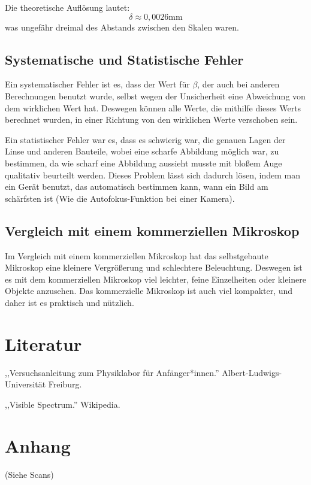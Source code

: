 \documentclass[11pt,a4paper]{article}
\begin{document}
Die theoretische Auflösung lautet:
$$\delta \approx 0,0026 \textrm{mm}$$
was ungefähr dreimal des Abstands zwischen den Skalen waren. 
\subsection{Systematische und Statistische Fehler}
Ein systematischer Fehler ist es, dass der Wert für $\beta$, der auch bei anderen Berechnungen benutzt wurde, selbst wegen der Unsicherheit eine Abweichung von dem wirklichen Wert hat. Deswegen können alle Werte, die mithilfe dieses Werts berechnet wurden, in einer Richtung von den wirklichen Werte verschoben sein. 

Ein statistischer Fehler war es, dass es schwierig war, die genauen Lagen der Linse und anderen Bauteile, wobei eine scharfe Abbildung möglich war, zu bestimmen, da wie scharf eine Abbildung aussieht musste mit bloßem Auge qualitativ beurteilt werden. Dieses Problem lässt sich dadurch lösen, indem man ein Gerät benutzt, das automatisch bestimmen kann, wann ein Bild am schärfsten ist (Wie die Autofokus-Funktion bei einer Kamera). 
\subsection{Vergleich mit einem kommerziellen Mikroskop}
Im Vergleich mit einem kommerziellen Mikroskop hat das selbstgebaute Mikroskop eine kleinere Vergrößerung und schlechtere Beleuchtung. Deswegen ist es mit dem kommerziellen Mikroskop viel leichter, feine Einzelheiten oder kleinere Objekte anzusehen. Das kommerzielle Mikroskop ist auch viel kompakter, und daher ist es praktisch und nützlich. 


\section{Literatur}
,,Versuchsanleitung zum Physiklabor für Anfänger*innen.'' Albert-Ludwigs-Universität Freiburg. 

,,Visible Spectrum.'' Wikipedia. 
\section{Anhang}
(Siehe Scans)
\end{document}

